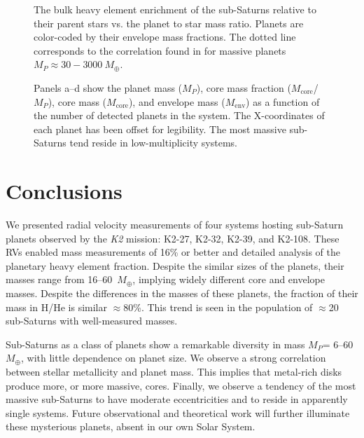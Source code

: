 \documentclass[preprint2]{aastex6}
\newcommand{\ktwo}{\textit{K2}\xspace}
\newcommand{\Mp}{\ensuremath{M_{P}}\xspace}
\newcommand{\Mcore}{\ensuremath{M_{\mathrm{core}}}\xspace}
\newcommand{\Menv}{\ensuremath{M_{\mathrm{env}}}\xspace}
\newcommand{\Mcmf}{\Mcore/\Mp}
\newcommand{\Me}{\ensuremath{M_{\oplus}}\xspace}
\begin{document}
\begin{figure*}
\caption{The bulk heavy element enrichment of the sub-Saturns relative to their parent stars vs. the planet to star mass ratio. Planets are color-coded by their envelope mass fractions. The dotted line corresponds to the correlation found in \citet{Thorngren16} for massive planets $\Mp \approx 30-3000~\Me$.\label{fig:metalratio}}
\end{figure*}

\begin{figure*}
\caption{Panels a--d show the planet mass (\Mp), core mass fraction (\Mcmf), core mass (\Mcore), and envelope mass (\Menv) as a function of the number of detected planets in the system. The X-coordinates of each planet has been offset for legibility. The most massive sub-Saturns tend reside in low-multiplicity systems.\label{fig:pnum}}
\end{figure*}

\section{Conclusions}
\label{sec:conclusions}

We presented radial velocity measurements of four systems hosting sub-Saturn planets observed by the \ktwo mission: K2-27, K2-32, K2-39, and K2-108. These RVs enabled mass measurements of 16\% or better and detailed analysis of the planetary heavy element fraction. Despite the similar sizes of the planets, their masses range from 16--60~\Me, implying widely different core and envelope masses. Despite the differences in the masses of these planets, the fraction of their mass in H/He is similar $\approx$80\%. This trend is seen in the population of $\approx$20 sub-Saturns with well-measured masses. 

Sub-Saturns as a class of planets show a remarkable diversity in mass \Mp = 6--60 \Me, with little dependence on planet size. We observe a strong correlation between stellar metallicity and planet mass. This implies that metal-rich disks produce more, or more massive, cores. Finally, we observe a tendency of the most massive sub-Saturns to have moderate eccentricities and to reside in apparently single systems. Future observational and theoretical work will further illuminate  these mysterious planets, absent in our own Solar System.
\end{document}
